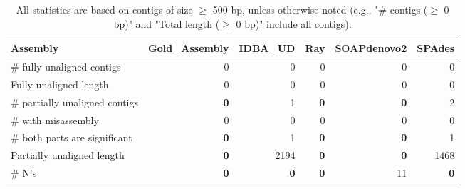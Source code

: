 \documentclass[12pt,a4paper]{article}
\begin{document}
\begin{table}[ht]
\begin{center}
\caption{All statistics are based on contigs of size $\geq$ 500 bp, unless otherwise noted (e.g., "\# contigs ($\geq$ 0 bp)" and "Total length ($\geq$ 0 bp)" include all contigs).}
\begin{tabular}{|l*{5}{|r}|}
\hline
Assembly & Gold\_Assembly & IDBA\_UD & Ray & SOAPdenovo2 & SPAdes \\ \hline
\# fully unaligned contigs & 0 & 0 & 0 & 0 & 0 \\ \hline
Fully unaligned length & 0 & 0 & 0 & 0 & 0 \\ \hline
\# partially unaligned contigs & {\bf 0} & 1 & {\bf 0} & {\bf 0} & 2 \\ \hline
\hspace{5mm}\# with misassembly & 0 & 0 & 0 & 0 & 0 \\ \hline
\hspace{5mm}\# both parts are significant & {\bf 0} & 1 & {\bf 0} & {\bf 0} & 1 \\ \hline
Partially unaligned length & {\bf 0} & 2194 & {\bf 0} & {\bf 0} & 1468 \\ \hline
\# N's & {\bf 0} & {\bf 0} & {\bf 0} & 11 & {\bf 0} \\ \hline
\end{tabular}
\end{center}
\end{table}
\end{document}
